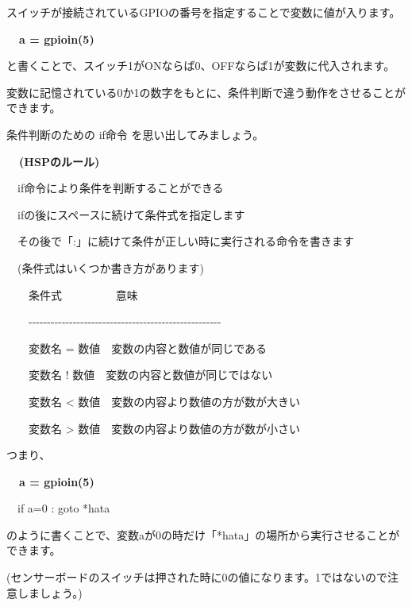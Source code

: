 \documentclass[a4paper,12pt]{jarticle}
\begin{document}
\bigskip
\bigskip
\bigskip

スイッチが接続されているGPIOの番号を指定することで変数に値が入ります。

\bigskip

{\bfseries
\ \ a = gpioin(5)}

\bigskip

と書くことで、スイッチ1がONならば0、OFFならば1が変数に代入されます。

変数に記憶されている0か1の数字をもとに、条件判断で違う動作をさせることができます。

条件判断のための if命令 を思い出してみましょう。

\bigskip
\bigskip
\bigskip

{\bfseries
\ \ (HSPのルール)


\bigskip

\ \ if命令により条件を判断することができる

\ \ ifの後にスペースに続けて条件式を指定します

\ \ その後で「:」に続けて条件が正しい時に実行される命令を書きます}


\bigskip

\ \ (条件式はいくつか書き方があります)


\bigskip

\ \ \ \ 条件式 \ \ \ \ \ \ \ \ \ 意味

\ \ \ \ {}-{}-{}-{}-{}-{}-{}-{}-{}-{}-{}-{}-{}-{}-{}-{}-{}-{}-{}-{}-{}-{}-{}-{}-{}-{}-{}-{}-{}-{}-{}-{}-{}-{}-{}-{}-{}-{}-{}-{}-{}-{}-{}-{}-{}-{}-{}-{}-{}-{}-{}-{}-

\ \ \ \ 変数名 =
数値\ \ 変数の内容と数値が同じである

\ \ \ \ 変数名 !
数値\ \ 変数の内容と数値が同じではない

\ \ \ \ 変数名 {\textless}
数値\ \ 変数の内容より数値の方が数が大きい

\ \ \ \ 変数名 {\textgreater}
数値\ \ 変数の内容より数値の方が数が小さい

\bigskip
\bigskip

つまり、

\bigskip

{\bfseries
\ \ a = gpioin(5)

\ \ if a=0 : goto *hata}

\bigskip

のように書くことで、変数aが0の時だけ「*hata」の場所から実行させることができます。

(センサーボードのスイッチは押された時に0の値になります。1ではないので注意しましょう。)
\end{document}

